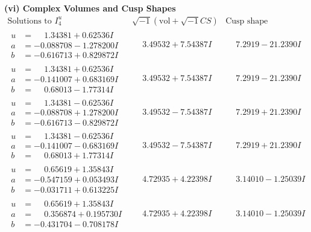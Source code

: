 \documentclass[1p]{elsarticle_modified}
\theoremstyle{definition}
\newcommand{\I}{\sqrt{-1}}
\begin{document}
\newpage\flushleft \textbf{(vi) Complex Volumes and Cusp Shapes}
$$\begin{array}{c|c|c}  
\text{Solutions to }I^u_{4}& \I (\text{vol} + \sqrt{-1}CS) & \text{Cusp shape}\\
 \hline 
\begin{aligned}
u &= \phantom{-}1.34381 + 0.62536 I \\
a &= -0.088708 - 1.278200 I \\
b &= -0.616713 + 0.829872 I\end{aligned}
 & \phantom{-}3.49532 + 7.54387 I & \phantom{-}7.2919 - 21.2390 I \\ \hline\begin{aligned}
u &= \phantom{-}1.34381 + 0.62536 I \\
a &= -0.141007 + 0.683169 I \\
b &= \phantom{-}0.68013 - 1.77314 I\end{aligned}
 & \phantom{-}3.49532 + 7.54387 I & \phantom{-}7.2919 - 21.2390 I \\ \hline\begin{aligned}
u &= \phantom{-}1.34381 - 0.62536 I \\
a &= -0.088708 + 1.278200 I \\
b &= -0.616713 - 0.829872 I\end{aligned}
 & \phantom{-}3.49532 - 7.54387 I & \phantom{-}7.2919 + 21.2390 I \\ \hline\begin{aligned}
u &= \phantom{-}1.34381 - 0.62536 I \\
a &= -0.141007 - 0.683169 I \\
b &= \phantom{-}0.68013 + 1.77314 I\end{aligned}
 & \phantom{-}3.49532 - 7.54387 I & \phantom{-}7.2919 + 21.2390 I \\ \hline\begin{aligned}
u &= \phantom{-}0.65619 + 1.35843 I \\
a &= -0.547159 + 0.053493 I \\
b &= -0.031711 + 0.613225 I\end{aligned}
 & \phantom{-}4.72935 + 4.22398 I & \phantom{-}3.14010 - 1.25039 I \\ \hline\begin{aligned}
u &= \phantom{-}0.65619 + 1.35843 I \\
a &= \phantom{-}0.356874 + 0.195730 I \\
b &= -0.431704 - 0.708178 I\end{aligned}
 & \phantom{-}4.72935 + 4.22398 I & \phantom{-}3.14010 - 1.25039 I \\ \hline\begin{aligned}

\end{aligned}
\end{array}$$
\end{document}

